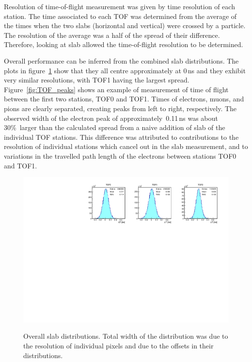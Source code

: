 Resolution of time-of-flight measurement was given by time resolution
of each station.
The time associated to each TOF was determined from the average of the times when the two slabs (horizontal and vertical) were crossed by a particle.
The resolution of the average was a half of the spread of their difference. Therefore, looking at slab \DT{} allowed the time-of-flight
resolution to be determined.


Overall performance can be inferred from the combined slab \DT{}
distributions. The plots in figure~\ref{fig:SlabDtAll} show that they
all centre approximately at 0\,ns and they exhibit very similar
resolutions, with TOF1 having the largest spread.
Figure~\ref{fig:TOF_peaks} shows an example of measurement of time of
flight between the first two stations, TOF0 and TOF1. Times of electrons,
muons, and pions are clearly separated, creating peaks from left to
right, respectively. The observed width of the electron peak of
approximately~0.11\,ns was about 30\%~larger than the calculated spread from a
naive addition of slab \DT{} of the individual TOF stations.
This difference was attributed to contributions to the resolution of
individual stations which cancel out in the slab \DT{} measurement,
and to variations in the travelled path length of the electrons between
stations TOF0 and TOF1.

\begin{figure}
  \begin{center}
  \includegraphics[width=0.9\columnwidth]{07_overall_slab_dt} \\
  \caption{Overall slab \DT{} distributions. Total width of the
    distribution was due to the resolution of individual pixels and due to
    the offsets in their \DT{} distributions.}
  \label{fig:SlabDtAll}
  \end{center}
\end{figure}

